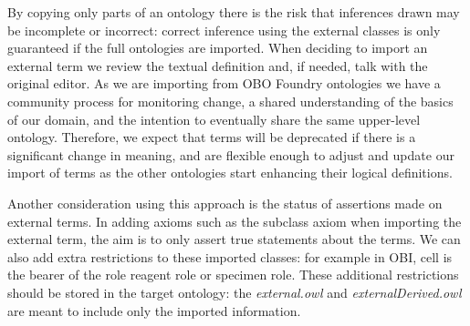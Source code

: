 \documentclass{elsart3p}    %
\newcommand{\protege}{Prot\'{e}g\'{e}}
\begin{document}
By copying only parts of an ontology there is the risk that inferences drawn may be incomplete or incorrect: correct inference using the external classes is only guaranteed if the full ontologies are imported.
When deciding to import an external term we review the textual definition and, if needed, talk with the original editor.
As we are importing from OBO Foundry ontologies we have a community process for monitoring change, a shared understanding of the basics of our domain, and the intention to eventually share the same upper-level ontology. 
Therefore, we expect that terms will be deprecated if there is a significant change in meaning, and are flexible enough to adjust and update our import of terms as the other ontologies start enhancing their logical definitions.


Another consideration using this approach is the status of assertions made on external terms.
In adding axioms such as the subclass axiom when importing the external term, the aim is to only assert true statements about the terms.
We can also add extra restrictions to these imported classes: for example in OBI, cell is the bearer of the role reagent role or specimen role. 
These additional restrictions should be stored in the target ontology: the \emph{external.owl} and \emph{externalDerived.owl} are meant to include only the imported information.
\end{document}
